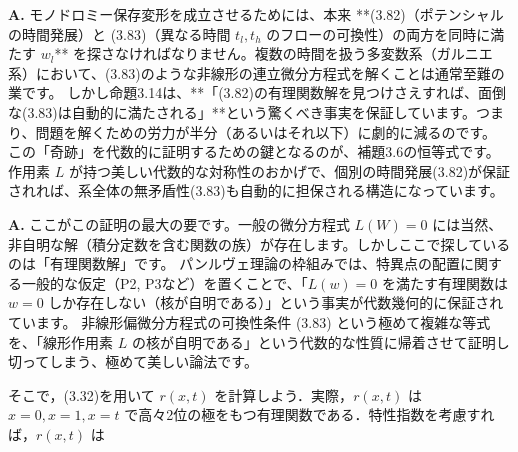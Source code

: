 \begin{Q}
\textbf{A.} モノドロミー保存変形を成立させるためには、本来 **(3.82)（ポテンシャルの時間発展）と (3.83)（異なる時間 $t_l, t_h$ のフローの可換性）の両方を同時に満たす $w_l$** を探さなければなりません。複数の時間を扱う多変数系（ガルニエ系）において、(3.83)のような非線形の連立微分方程式を解くことは通常至難の業です。
しかし命題3.14は、**「(3.82)の有理関数解を見つけさえすれば、面倒な(3.83)は自動的に満たされる」**という驚くべき事実を保証しています。つまり、問題を解くための労力が半分（あるいはそれ以下）に劇的に減るのです。
この「奇跡」を代数的に証明するための鍵となるのが、補題3.6の恒等式です。作用素 $L$ が持つ美しい代数的な対称性のおかげで、個別の時間発展(3.82)が保証されれば、系全体の無矛盾性(3.83)も自動的に担保される構造になっています。
\end{Q}

\begin{Q}[【核心】作用素 $L$ で括った中身が $=0$ になるのはなぜか？積分定数のようなものは出ないのか？]
\textbf{A.} ここがこの証明の最大の要です。一般の微分方程式 $L(W) = 0$ には当然、非自明な解（積分定数を含む関数の族）が存在します。しかしここで探しているのは「有理関数解」です。
パンルヴェ理論の枠組みでは、特異点の配置に関する一般的な仮定（P2, P3など）を置くことで、「$L(w)=0$ を満たす有理関数は $w=0$ しか存在しない（核が自明である）」という事実が代数幾何的に保証されています。
非線形偏微分方程式の可換性条件 (3.83) という極めて複雑な等式を、「線形作用素 $L$ の核が自明である」という代数的な性質に帰着させて証明し切ってしまう、極めて美しい論法です。
\end{Q}

\begin{story}
そこで，(3.32)を用いて $r(x,t)$ を計算しよう．実際，$r(x,t)$ は $x=0, x=1, x=t$ で高々2位の極をもつ有理関数である．特性指数を考慮すれば，$r(x,t)$ は

\end{story}

